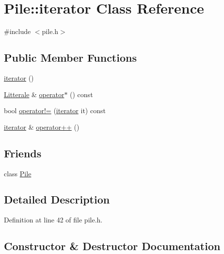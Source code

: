 \hypertarget{class_pile_1_1iterator}{}\section{Pile\+:\+:iterator Class Reference}
\label{class_pile_1_1iterator}


{\ttfamily \#include $<$pile.\+h$>$}

\subsection*{Public Member Functions}
\begin{DoxyCompactItemize}
\item 
\hyperlink{class_pile_1_1iterator_a840f05175548dd9ac7bb595206f0044f}{iterator} ()
\item 
\hyperlink{class_litterale}{Litterale} \& \hyperlink{class_pile_1_1iterator_a5a84d0211e5cfb4ddb45661d7e940e87}{operator$\ast$} () const 
\item 
bool \hyperlink{class_pile_1_1iterator_abfe0e25a2ebc5f3188c7a13f09d19129}{operator!=} (\hyperlink{class_pile_1_1iterator}{iterator} it) const 
\item 
\hyperlink{class_pile_1_1iterator}{iterator} \& \hyperlink{class_pile_1_1iterator_a05b171f7019504d6fb1b6a9a183bd75b}{operator++} ()
\end{DoxyCompactItemize}
\subsection*{Friends}
\begin{DoxyCompactItemize}
\item 
class \hyperlink{class_pile_1_1iterator_a77806361379cf369e95d2b4346c7e28a}{Pile}
\end{DoxyCompactItemize}


\subsection{Detailed Description}


Definition at line 42 of file pile.\+h.



\subsection{Constructor \& Destructor Documentation}
